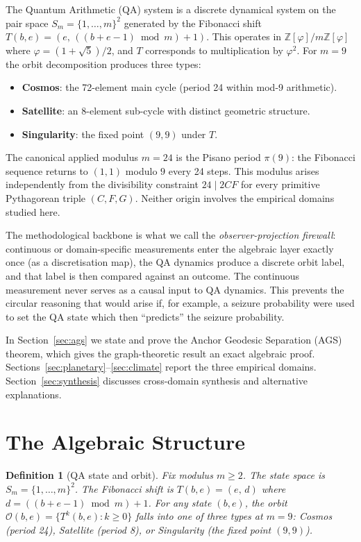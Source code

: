 \documentclass[11pt]{article}
\newtheorem{definition}{Definition}[section]
\begin{document}
The Quantum Arithmetic (QA) system is a discrete dynamical system on the pair space
$S_m = \{1,\dots,m\}^2$ generated by the Fibonacci shift
$T(b,e) = (e,\, ((b+e-1) \bmod m) + 1)$.
This operates in $\mathbb{Z}[\varphi]/m\mathbb{Z}[\varphi]$ where $\varphi = (1+\sqrt5)/2$,
and $T$ corresponds to multiplication by $\varphi^2$.
For $m=9$ the orbit decomposition produces three types:
\begin{itemize}
  \item \textbf{Cosmos}: the 72-element main cycle (period 24 within mod-9 arithmetic).
  \item \textbf{Satellite}: an 8-element sub-cycle with distinct geometric structure.
  \item \textbf{Singularity}: the fixed point $(9,9)$ under $T$.
\end{itemize}
The canonical applied modulus $m=24$ is the Pisano period $\pi(9)$:
the Fibonacci sequence returns to $(1,1)$ modulo $9$ every 24 steps.
This modulus arises independently from the divisibility constraint
$24 \mid 2CF$ for every primitive Pythagorean triple $(C,F,G)$.
Neither origin involves the empirical domains studied here.

The methodological backbone is what we call the \emph{observer-projection firewall}:
continuous or domain-specific measurements enter the algebraic layer exactly once
(as a discretisation map), the QA dynamics produce a discrete orbit label,
and that label is then compared against an outcome.
The continuous measurement never serves as a causal input to QA dynamics.
This prevents the circular reasoning that would arise if, for example,
a seizure probability were used to set the QA state which then ``predicts''
the seizure probability.

In Section~\ref{sec:ags} we state and prove the Anchor Geodesic Separation (AGS) theorem,
which gives the graph-theoretic result an exact algebraic proof.
Sections~\ref{sec:planetary}--\ref{sec:climate} report the three empirical domains.
Section~\ref{sec:synthesis} discusses cross-domain synthesis and alternative explanations.

\section{The Algebraic Structure}\label{sec:algebra}

\begin{definition}[QA state and orbit]
Fix modulus $m \geq 2$.  The \emph{state space} is $S_m = \{1,\dots,m\}^2$.
The \emph{Fibonacci shift} is $T(b,e) = (e,\, d)$ where $d = ((b+e-1)\bmod m)+1$.
For any state $(b,e)$, the orbit $\mathcal{O}(b,e) = \{T^k(b,e) : k \geq 0\}$
falls into one of three types at $m=9$: Cosmos (period 24), Satellite (period 8),
or Singularity (the fixed point $(9,9)$).
\end{definition}
\end{document}
